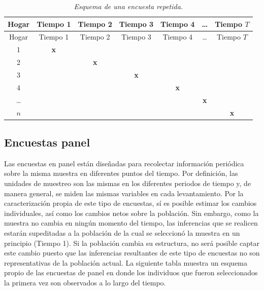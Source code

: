 \documentclass[
  12pt,
  spanish,
]{book}
\begin{document}
\begin{longtable}[]{@{}ccccccc@{}}
\caption{\emph{Esquema de una encuesta repetida.}}\tabularnewline
\toprule
Hogar & Tiempo 1 & Tiempo 2 & Tiempo 3 & Tiempo 4 & \ldots{} & Tiempo \(T\) \\
\midrule
\endfirsthead
\toprule
Hogar & Tiempo 1 & Tiempo 2 & Tiempo 3 & Tiempo 4 & \ldots{} & Tiempo \(T\) \\
\midrule
\endhead
1 & \textbf{x} & & & & & \\
2 & & \textbf{x} & & & & \\
3 & & & \textbf{x} & & & \\
4 & & & & \textbf{x} & & \\
\ldots{} & & & & & \textbf{x} & \\
\(n\) & & & & & & \textbf{x} \\
\bottomrule
\end{longtable}

\hypertarget{encuestas-panel}{%
\subsection{Encuestas panel}\label{encuestas-panel}}

Las encuestas en panel están diseñadas para recolectar información periódica sobre la misma muestra en diferentes puntos del tiempo. Por definición, las unidades de muestreo son las mismas en los diferentes periodos de tiempo y, de manera general, se miden las mismas variables en cada levantamiento. Por la caracterización propia de este tipo de encuestas, sí es posible estimar los cambios individuales, así como los cambios netos sobre la población. Sin embargo, como la muestra no cambia en ningún momento del tiempo, las inferencias que se realicen estarán supeditadas a la población de la cual se seleccionó la muestra en un principio (Tiempo 1). Si la población cambia su estructura, no será posible captar este cambio puesto que las inferencias resultantes de este tipo de encuestas no son representativas de la población actual. La siguiente tabla muestra un esquema propio de las encuestas de panel en donde los individuos que fueron seleccionados la primera vez son observados a lo largo del tiempo.
\end{document}
